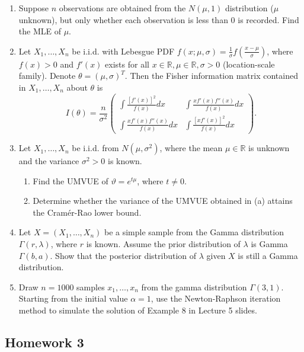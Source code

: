 \begin{enumerate}
    \item Suppose \(n\) observations are obtained from the \(N(\mu, 1)\) distribution (\(\mu\) unknown), but only whether each observation is less than $0$ is recorded. Find the MLE of \(\mu\).

    \item Let \(X_1, \ldots, X_n\) be i.i.d. with Lebesgue PDF \(f(x; \mu, \sigma) = \frac{1}{\sigma} f\left(\frac{x - \mu}{\sigma}\right)\), where \(f(x) > 0\) and \(f'(x)\) exists for all \(x \in \mathbb{R}, \mu \in \mathbb{R}, \sigma > 0\) (location-scale family). Denote \(\theta = (\mu, \sigma)^T\). Then the Fisher information matrix contained in \(X_1, \ldots, X_n\) about \(\theta\) is
    \[
    I(\theta) = \frac{n}{\sigma^2} \begin{pmatrix}
    \int \frac{[f'(x)]^2}{f(x)} dx & \int \frac{x f'(x) f''(x)}{f(x)} dx \\
    \int \frac{x f'(x) f''(x)}{f(x)} dx & \int \frac{[x f'(x)]^2}{f(x)} dx
    \end{pmatrix}.
    \]

    \item Let \(X_1, \ldots, X_n\) be i.i.d. from \(N(\mu, \sigma^2)\), where the mean \(\mu \in \mathbb{R}\) is unknown and the variance \(\sigma^2 > 0\) is known.
    \begin{enumerate}
        \item Find the UMVUE of \(\vartheta = e^{t\mu}\), where \(t \neq 0\).
        \item Determine whether the variance of the UMVUE obtained in (a) attains the Cramér-Rao lower bound.
    \end{enumerate}

    \item Let \(X = (X_1, \ldots, X_n)\) be a simple sample from the Gamma distribution \(\Gamma(r, \lambda)\), where \(r\) is known. Assume the prior distribution of \(\lambda\) is Gamma \(\Gamma(b, a)\). Show that the posterior distribution of \(\lambda\) given \(X\) is still a Gamma distribution.

    \item Draw \(n = 1000\) samples \(x_1, \ldots, x_n\) from the gamma distribution \(\Gamma(3, 1)\). Starting from the initial value \(\alpha = 1\), use the Newton-Raphson iteration method to simulate the solution of Example 8 in Lecture 5 slides.
\end{enumerate}

\subsection*{Homework 3}

